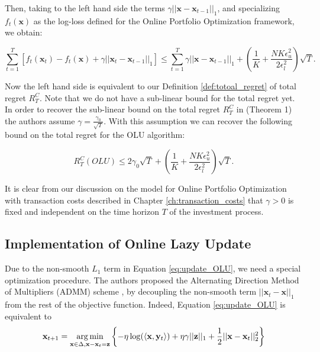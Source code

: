 Then, taking to the left hand side the terms $\gamma||\mathbf x-\mathbf x_{t-1}||_1$, and specializing $f_t(\mathbf x)$ as the log-loss defined for the Online Portfolio Optimization framework, we obtain:

\begin{equation}
\sum\limits_{t=1}^T[f_t(\mathbf x_t)-f_t(\mathbf x)+\gamma||\mathbf x_t-\mathbf x_{t-1}||_1]\le \sum\limits_{t=1}^T\gamma||\mathbf x-\mathbf x_{t-1}||_1+\left( \frac{1}{K} + \frac{N K \epsilon_u^2 }{2 \epsilon_l^2} \right) \sqrt{T}.
\end{equation}

Now the left hand side is equivalent to our Definition \ref{def:totoal_regret} of total regret $R_T^C$. Note that we do not have a sub-linear bound for the total regret yet. In order to recover the sub-linear bound on the total regret $R_T^C$ in \cite{das2014online} (Theorem 1) the authors assume $\gamma=\frac{\gamma_0}{\sqrt{T}}$. With this assumption we can recover the following bound on the total regret for the OLU algorithm:

\begin{equation}
R_T^C(OLU)\le2\gamma_0\sqrt{T}+\left( \frac{1}{K} + \frac{N K \epsilon_u^2 }{2 \epsilon_l^2} \right) \sqrt{T}.
\end{equation}

It is clear from our discussion on the model for Online Portfolio Optimization with transaction costs described in Chapter \ref{ch:transaction_costs} that $\gamma>0$ is fixed and independent on the time horizon $T$ of the investment process. 

\subsection{Implementation of Online Lazy Update}

Due to the non-smooth $L_1$ term in Equation \eqref{eq:update_OLU}, we need a special optimization procedure. The authors proposed the Alternating Direction Method of Multipliers (ADMM) scheme \cite{boyd2011distributed}, by decoupling the non-smooth term $||\mathbf x_t-\mathbf x||_1$ from the rest of the objective function.
Indeed, Equation \eqref{eq:update_OLU} is equivalent to 
\begin{equation}
\mathbf x_{t+1}=\operatorname*{arg\,min}\limits_{\mathbf x\in\Delta,\mathbf x-\mathbf x_t=\mathbf z}\left\{-\eta\log(\langle\mathbf x,\mathbf y_t\rangle)+\eta\gamma||\mathbf z||_1+\frac{1}{2}||\mathbf x-\mathbf x_t||_2^2\right\}
\end{equation}

